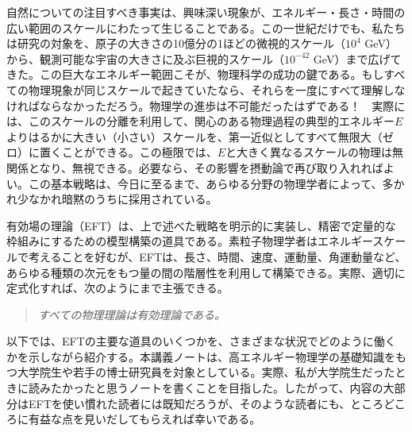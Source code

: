



自然についての注目すべき事実は、興味深い現象が、エネルギー・長さ・時間の広い範囲のスケールにわたって生じることである。この一世紀だけでも、私たちは研究の対象を、原子の大きさの10億分の1ほどの微視的スケール（$10^4$ GeV）から、観測可能な宇宙の大きさに及ぶ巨視的スケール（$10^{-42}$ GeV）まで広げてきた。この巨大なエネルギー範囲こそが、物理科学の成功の鍵である。もしすべての物理現象が同じスケールで起きていたなら、それらを一度にすべて理解しなければならなかっただろう。物理学の進歩は不可能だったはずである！　実際には、このスケールの分離を利用して、関心のある物理過程の典型的エネルギー$E$よりはるかに大きい（小さい）スケールを、第一近似としてすべて無限大（ゼロ）に置くことができる。この極限では、$E$と大きく異なるスケールの物理は無関係となり、無視できる。必要なら、その影響を摂動論で再び取り入れればよい。この基本戦略は、今日に至るまで、あらゆる分野の物理学者によって、多かれ少なかれ暗黙のうちに採用されている。

有効場の理論（EFT）は、上で述べた戦略を明示的に実装し、精密で定量的な枠組みにするための模型構築の道具である。素粒子物理学者はエネルギースケールで考えることを好むが、EFTは、長さ、時間、速度、運動量、角運動量など、あらゆる種類の次元をもつ量の間の階層性を利用して構築できる。実際、適切に定式化すれば、次のようにまで主張できる。
\vspace{.3cm}
%
\begin{quotation}
\noindent \hspace{3cm} {\it すべての物理理論は有効理論である。}
\end{quotation}
%
\vspace{.3cm}

以下では、EFTの主要な道具のいくつかを、さまざまな状況でどのように働くかを示しながら紹介する。本講義ノートは、高エネルギー物理学の基礎知識をもつ大学院生や若手の博士研究員を対象としている。実際、私が大学院生だったときに読みたかったと思うノートを書くことを目指した。したがって、内容の大部分はEFTを使い慣れた読者には既知だろうが、そのような読者にも、ところどころに有益な点を見いだしてもらえれば幸いである。




